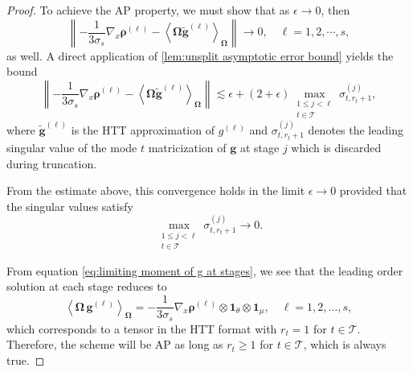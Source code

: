 \documentclass[onefignum,onetabnum]{siamart220329}
\begin{document}
\begin{proof}
    To achieve the AP property, we must show that as $\epsilon \rightarrow 0$, then
    $$
        \left\lVert -\frac{1}{3\sigma_s} \nabla_x \boldsymbol{\rho}^{(\ell)} - \left\langle \mathbf{\Omega} \widetilde{\mathbf{g}}^{(\ell)} \right\rangle_{\mathbf{\Omega}} \right\rVert \rightarrow 0, \quad \ell = 1, 2, \cdots, s,
    $$
    as well. A direct application of \cref{lem:unsplit asymptotic error bound} yields the bound
    $$
        \left\lVert -\frac{1}{3\sigma_s} \nabla_x \boldsymbol{\rho}^{(\ell)} - \left\langle \mathbf{\Omega} \widetilde{\mathbf{g}}^{(\ell)} \right\rangle_{\mathbf{\Omega}} \right\rVert \lesssim \epsilon + (2 + \epsilon)\max_{\substack{1 \leq j < \ell \\ t \in \mathcal{T}}} \sigma_{t,r_{t}+1}^{(j)},
    $$
    where $\widetilde{\mathbf{g}}^{(\ell)}$ is the HTT approximation of $g^{(\ell)}$ and $\sigma_{t,r_{t}+1}^{(j)}$ denotes the leading singular value of the mode $t$ matricization of $\mathbf{g}$ at stage $j$ which is discarded during truncation.

    From the estimate above, this convergence holds in the limit $\epsilon \rightarrow 0$ provided that the singular values satisfy
    \begin{equation*}
        \max_{\substack{1 \leq j < \ell \\ t \in \mathcal{T}}} \sigma_{t,r_{t}+1}^{(j)} \rightarrow 0.
    \end{equation*}

    From equation \eqref{eq:limiting moment of g at stages}, we see that the leading order solution at each stage reduces to
    $$
        \left\langle \boldsymbol{\Omega} \, \mathbf{g}^{(\ell)} \right\rangle_{\boldsymbol{\Omega}} = -\frac{1}{3\sigma_s} \nabla_x \boldsymbol{\rho}^{(\ell)} \otimes \mathbf{1}_{\theta} \otimes \mathbf{1}_{\mu}, \quad \ell = 1, 2, \dots, s,
    $$
    which corresponds to a tensor in the HTT format with $r_{t} = 1$ for $t \in \mathcal{T}$. Therefore, the scheme will be AP as long as $r_{t} \geq 1$ for $t \in \mathcal{T}$, which is always true.
\end{proof}
\end{document}
